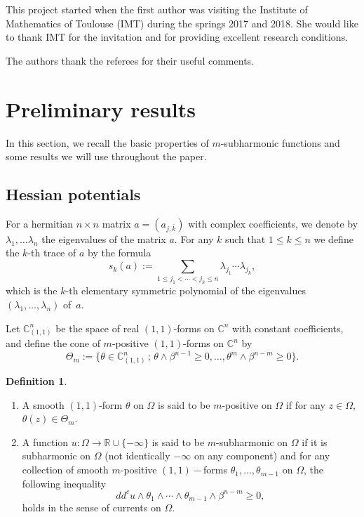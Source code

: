 \documentclass[11pt]{article}
\newcommand{\skpt}{\smallskip}
\providecommand{\C}{}
\numberwithin{equation}{section}
\newcommand{\sep}{\,;\,}
\theoremstyle{definition}
\newtheorem{definition}[theorem]{Definition}
\newcommand{\R}{\mathbb{R}}
\renewcommand{\C}{\mathbb{C}}
\theoremstyle{plain}
\theoremstyle{definition}
\begin{document}
This project started when the first author was visiting the Institute of Mathematics of Toulouse (IMT) during the springs 2017 and 2018. She would like to thank IMT for the invitation and for providing excellent research conditions.

The authors thank the referees for their useful comments.

\section{Preliminary results}\label{sec:2}
In this section, we recall the basic properties of $m$-subharmonic functions and some results we will use throughout the paper.

\subsection{Hessian potentials}
For a hermitian $n \times n$ matrix $a = (a_{j,\bar k})$ with complex coefficients, we denote by $\lambda_1,\dots \lambda_n$ the eigenvalues of the matrix $a$. For any $k$ such that $1 \leq k \leq n$ we define the $k$-th trace of $a$ by the formula
\[
s_k (a):= \sum_{1 \leq j_1 < \cdots < j_k \leq n} \lambda_{j_1} \cdots \lambda_{j_k},
\]
which is the $k$-th elementary symmetric polynomial of the eigenvalues $(\lambda_1,\dots, \lambda_n)$ of~$a$.

Let $\C^n_{(1,1)} $ be the space of real $(1, 1)$-forms on $\C^n$ with constant
coefficients, and define the cone of $m$-positive $(1,1)$-forms on $\C^n$ by
\begin{equation}\label{eq:mpositive}
\Theta_m:= \{\theta \in \C^n_{(1,1)} \sep \theta \wedge \beta^{n - 1} \geq 0,\dots, \theta^m \wedge \beta^{n - m} \geq 0\}.
\end{equation}

\skpt
\begin{definition} \label{def:mpositive}
\begin{enumerate}
\item
A smooth $(1,1)$-form $\theta$ on $\Omega$ is said to be $m$-positive on $\Omega$ if for any $z \in \Omega$, $\theta (z) \in \Theta_m$.

\item
A function $u:\Omega \to \R\cup\{-\infty\}$ is said to be $m$-subharmonic on $\Omega$ if it is subharmonic on $\Omega$ (not identically $-\infty$ on any component) and for any collection of smooth $m$-positive $(1,1)-$forms $\theta_1,\dots,\theta_{m-1}$ on $\Omega$, the following inequality
\[
dd^c u\wedge \theta_1\wedge\cdots\wedge\theta_{m-1} \wedge \beta^{n-m}\geq 0,
\]
holds in the sense of currents on $\Omega$.
\end{enumerate}
\end{definition}
\end{document}
